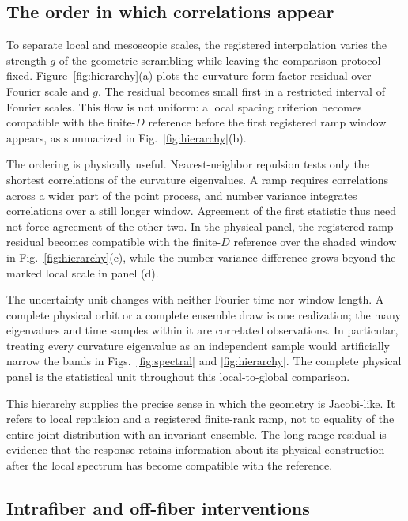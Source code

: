 \subsection{The order in which correlations appear}

To separate local and mesoscopic scales, the registered interpolation varies
the strength $g$ of the geometric scrambling while leaving the comparison
protocol fixed.  Figure~\ref{fig:hierarchy}(a) plots the curvature-form-factor
residual over Fourier scale and $g$.  The residual becomes small first in a
restricted interval of Fourier scales.  This flow is not uniform: a local
spacing criterion becomes compatible with the finite-$D$ reference before
the first registered ramp window appears, as summarized in
Fig.~\ref{fig:hierarchy}(b).

The ordering is physically useful.  Nearest-neighbor repulsion tests only the
shortest correlations of the curvature eigenvalues.  A ramp requires
correlations across a wider part of the point process, and number variance
integrates correlations over a still longer window.  Agreement of the first
statistic thus need not force agreement of the other two.  In the physical
panel, the registered ramp residual becomes compatible with the finite-$D$
reference over the shaded window in Fig.~\ref{fig:hierarchy}(c), while the
number-variance difference grows beyond the marked local scale in panel (d).

The uncertainty unit changes with neither Fourier time nor window length.  A
complete physical orbit or a complete ensemble draw is one realization; the
many eigenvalues and time samples within it are correlated observations.  In
particular, treating every curvature eigenvalue as an independent sample
would artificially narrow the bands in Figs.~\ref{fig:spectral} and
\ref{fig:hierarchy}.  The complete physical panel is the statistical unit
throughout this local-to-global comparison.

This hierarchy supplies the precise sense in which the geometry is
Jacobi-like.  It refers to local repulsion and a registered finite-rank ramp,
not to equality of the entire joint distribution with an invariant ensemble.
The long-range residual is evidence that the response retains information
about its physical construction after the local spectrum has become
compatible with the reference.

\subsection{Intrafiber and off-fiber interventions}

